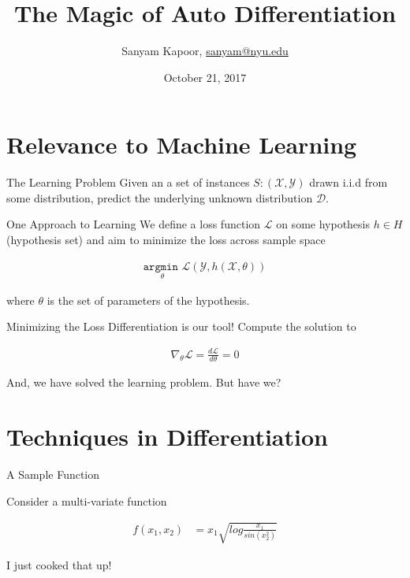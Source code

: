 \documentclass{beamer}
\title{The Magic of Auto Differentiation}
\author{Sanyam Kapoor, \href{mailto:sanyam@nyu.edu}{sanyam@nyu.edu}}
\date{October 21, 2017}
\institute{Courant Institute, NYU}
\begin{document}
\maketitle

\section{Relevance to Machine Learning}

\begin{frame}{The Learning Problem}
Given an a set of instances $S: (\mathcal{X}, \mathcal{Y})$ drawn i.i.d from some
distribution, predict the underlying unknown distribution $\mathcal{D}$.
\end{frame}

\begin{frame}{One Approach to Learning}
We define a loss function $\mathcal{L}$ on some hypothesis $h \in H$ (hypothesis set) and 
aim to minimize the loss across sample space

\begin{align}
\underset{\theta}{\texttt{argmin }} \mathcal{L}(\mathcal{Y}, h(\mathcal{X}, \theta))
\end{align}

where $\theta$ is the set of parameters of the hypothesis.

\end{frame}

\begin{frame}{Minimizing the Loss}
Differentiation is our tool! Compute the solution to

\begin{align}
\nabla_\theta \mathcal{L} = \frac{d \mathcal{L}}{d \theta} = 0
\end{align}

And, we have solved the learning problem. But have we?

\end{frame}

\section{Techniques in Differentiation}

\begin{frame}{A Sample Function}

Consider a multi-variate function

\begin{align}
f(x_1,x_2) &= x_1\sqrt{log \frac{x_1}{sin(x_2^2)}} \label{eq:sample}
\end{align}

I just cooked that up!

\end{frame}
\end{document}
